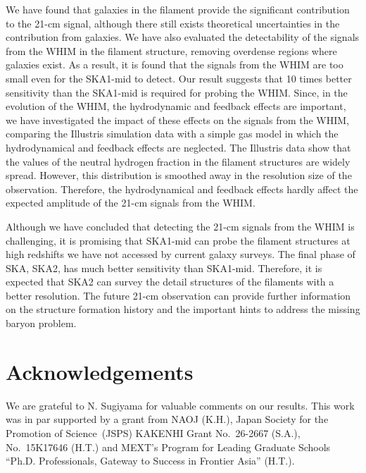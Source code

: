 \documentclass[a4paper,fleqn,usenatbib,useAMS]{mnras}
\begin{document}
We have found that galaxies in the filament provide the significant
contribution to the 21-cm signal, although there still exists theoretical uncertainties in the contribution from galaxies. 
We have also evaluated the detectability of the signals from the WHIM in
the filament structure, removing overdense regions where galaxies exist. 
As a result, it is found that the signals from the WHIM are too small even for the SKA1-mid to detect.
Our result suggests that 10 times better sensitivity than the SKA1-mid is required for probing the WHIM. 
Since, in the evolution of the WHIM, the hydrodynamic and feedback effects are important,
we have investigated the impact of these effects on the signals from the WHIM, comparing the Illustris simulation data with a simple gas model in which the hydrodynamical and feedback effects are neglected. 
The Illustris data show that the values of the neutral hydrogen fraction in the filament
structures are widely spread. 
However, this distribution is smoothed away in the resolution size of
the observation. 
Therefore, the hydrodynamical and feedback effects hardly affect the expected amplitude of the 21-cm signals from the WHIM. 

Although we have concluded that detecting the 21-cm signals from the WHIM is challenging, 
it is promising that SKA1-mid can probe the filament structures at high
redshifts we have not accessed by current galaxy surveys.
The final phase of SKA, SKA2, has much better sensitivity than SKA1-mid.
Therefore, it is expected that SKA2 can survey the detail structures of
the filaments with a better resolution. 
The future 21-cm observation can provide further information on the
structure formation history and the important hints to address the
missing baryon problem.

\section*{Acknowledgements}

We are grateful to N. Sugiyama for valuable comments on our results. 
This work was in par supported by a grant from NAOJ (K.H.), 
Japan Society for the Promotion of Science~(JSPS) KAKENHI Grant 
No.~26-2667 (S.A.),
No.~15K17646 (H.T.) and MEXT's Program for Leading Graduate Schools
``Ph.D. Professionals, Gateway to Success in Frontier Asia'' (H.T.). 






\bsp	%
\label{lastpage}
\end{document}
